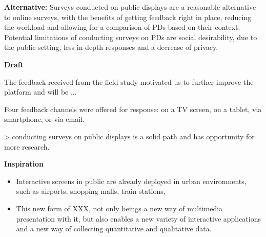	\textbf{Alternative:} Surveys conducted on public displays are a reasonable alternative to online surveys, with the benefits of getting feedback right in place, reducing the workload and allowing for a comparison of PDs based on their context. Potential limitations of conducting surveys on PDs are social desirability, due to the public setting, less in-depth responses and a decrease of privacy.










\textbf{Draft}

	The feedback received from the field study motivated us to further improve the platform and will be ...

	Four feedback channels were offered for response: on a TV screen, on a tablet, via smartphone, or via email.

	> conducting surveys on public displays is a solid path and has opportunity for more research.




\textbf{Inspiration}

	\begin{itemize}
	\item Interactive screens in public are already deployed in urban environments, such as airports, shopping malls, train stations, 
	\item This new form of XXX, not only beings a new way of multimedia presentation with it, but also enables a new variety of interactive applications and a new way of collecting quantitative and qualitative data.
	\end{itemize}

